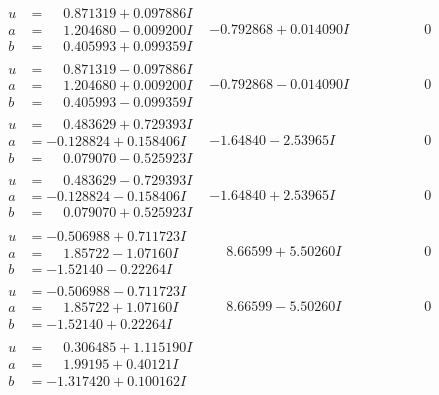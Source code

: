 \documentclass[1p]{elsarticle_modified}
\theoremstyle{definition}
\begin{document}
$$\begin{array}{c|c|c}
\begin{aligned}
u &= \phantom{-}0.871319 + 0.097886 I \\
a &= \phantom{-}1.204680 - 0.009200 I \\
b &= \phantom{-}0.405993 + 0.099359 I\end{aligned}
 & -0.792868 + 0.014090 I & \phantom{-0.000000 } 0 \\ \hline\begin{aligned}
u &= \phantom{-}0.871319 - 0.097886 I \\
a &= \phantom{-}1.204680 + 0.009200 I \\
b &= \phantom{-}0.405993 - 0.099359 I\end{aligned}
 & -0.792868 - 0.014090 I & \phantom{-0.000000 } 0 \\ \hline\begin{aligned}
u &= \phantom{-}0.483629 + 0.729393 I \\
a &= -0.128824 + 0.158406 I \\
b &= \phantom{-}0.079070 - 0.525923 I\end{aligned}
 & -1.64840 - 2.53965 I & \phantom{-0.000000 } 0 \\ \hline\begin{aligned}
u &= \phantom{-}0.483629 - 0.729393 I \\
a &= -0.128824 - 0.158406 I \\
b &= \phantom{-}0.079070 + 0.525923 I\end{aligned}
 & -1.64840 + 2.53965 I & \phantom{-0.000000 } 0 \\ \hline\begin{aligned}
u &= -0.506988 + 0.711723 I \\
a &= \phantom{-}1.85722 - 1.07160 I \\
b &= -1.52140 - 0.22264 I\end{aligned}
 & \phantom{-}8.66599 + 5.50260 I & \phantom{-0.000000 } 0 \\ \hline\begin{aligned}
u &= -0.506988 - 0.711723 I \\
a &= \phantom{-}1.85722 + 1.07160 I \\
b &= -1.52140 + 0.22264 I\end{aligned}
 & \phantom{-}8.66599 - 5.50260 I & \phantom{-0.000000 } 0 \\ \hline\begin{aligned}
u &= \phantom{-}0.306485 + 1.115190 I \\
a &= \phantom{-}1.99195 + 0.40121 I \\
b &= -1.317420 + 0.100162 I\end{aligned}

\end{array}$$
\end{document}
